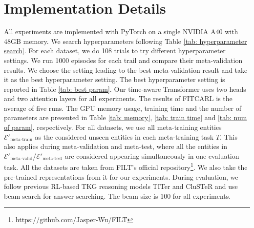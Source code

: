 \documentclass[runningheads]{llncs}
\begin{document}
\section{Implementation Details}
All experiments are implemented with PyTorch \cite{DBLP:conf/nips/PaszkeGMLBCKLGA19} on a single NVIDIA A40 with 48GB memory. We search hyperparameters following Table \ref{tab: hyperparameter search}. For each dataset, we do 108 trials to try different hyperparameter settings. We run 1000 episodes for each trail and compare their meta-validation results. We choose the setting leading to the best meta-validation result and take it as the best hyperparameter setting. The best hyperparameter setting is reported in Table \ref{tab: best param}. Our time-aware Transformer uses two heads and two attention layers for all experiments. The results of FITCARL is the average of five runs. The GPU memory usage, training time and the number of parameters are presented in Table \ref{tab: memory}, \ref{tab: train time} and \ref{tab: num of param}, respectively. For all datasets, we use all meta-training entities $\mathcal{E}'_{\text{meta-train}}$ as the considered unseen entities in each meta-training task $T$. This also applies during meta-validation and meta-test, where all the entities in $\mathcal{E}'_{\text{meta-valid}}$/$\mathcal{E}'_{\text{meta-test}}$ are considered appearing simultaneously in one evaluation task. All the datasets are taken from FILT's official repository\footnote{https://github.com/Jasper-Wu/FILT}.
We also take the pre-trained representations from it for our experiments. During evaluation, we follow previous RL-based TKG reasoning models TITer and CluSTeR and use beam search for answer searching. The beam size is 100 for all experiments.
\end{document}
